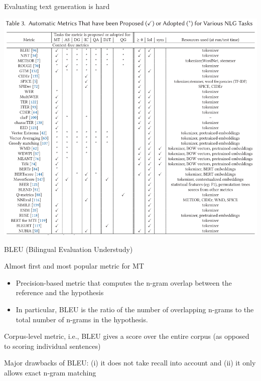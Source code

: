 \documentclass[12pt,aspectratio=169,handout]{beamer}
\begin{document}
\begin{frame}{Evaluating text generation is hard}
	
\includegraphics[trim={0 12.2cm 0 0},clip,width=1.2\linewidth]{img/nlg2.png}



\end{frame}


\begin{frame}{BLEU (Bilingual Evaluation Understudy)}

Almost first and most popular metric for MT

\begin{itemize}
	\item Precision-based metric that computes the n-gram overlap between the reference and the hypothesis
	\item In particular, BLEU is the ratio of the number of overlapping n-grams to the total number of n-grams in the hypothesis.
\end{itemize}


Corpus-level metric, i.e., BLEU gives a score over the entire corpus (as opposed to scoring individual sentences)

Major drawbacks of BLEU: (i) it does not take recall into account and (ii) it only allows exact n-gram matching


\end{frame}
\end{document}
